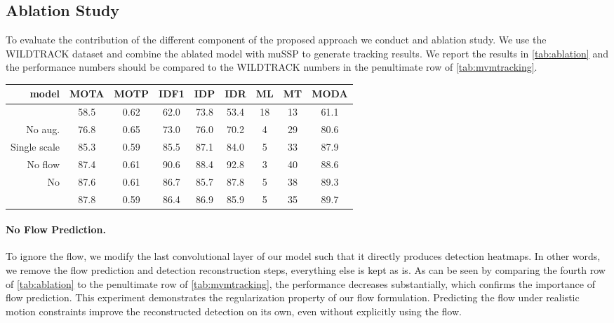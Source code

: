\documentclass[10pt,twocolumn,letterpaper]{article}
\begin{document}
\subsection{Ablation Study}
To evaluate the contribution of the different component of the proposed approach we conduct and ablation study. We use the WILDTRACK dataset and combine the ablated model with muSSP to generate tracking results.  We report the results in \cref{tab:ablation} and the performance numbers should be compared to the WILDTRACK numbers in the penultimate row of \cref{tab:mvmtracking}.
\begin{table*}[h]
    \begin{center}
    \begin{tabular}{r  c c c c c c c c } \toprule
    
model & MOTA & MOTP & IDF1 & IDP & IDR & ML & MT &  MODA \\ \midrule
     & 58.5 & 0.62 & 62.0 & 73.8 & 53.4 & 18 & 13 & 61.1 \\
    No aug. & 76.8 & 0.65 & 73.0 & 76.0 & 70.2 & 4  & 29 & 80.6 \\
    Single scale & 85.3 & 0.59 & 85.5 & 87.1 & 84.0 & 5  & 33 & 87.9 \\
    No flow & 87.4 & 0.61 & 90.6 & 88.4 & 92.8 & 3 & 40 & 88.6  \\
    No  & 87.6 & 0.61 & 86.7 & 85.7 & 87.8 & 5 & 38 & 89.3  \\
     & 87.8 & 0.59 & 86.4 & 86.9 & 85.9 & 5 & 35 & 89.7  \\
    \bottomrule
    \end{tabular}
    \end{center}
      \caption{\textbf{Ablation result on multi-view multi-person tracking} Using the WILDTRACK dataset, 
      we test how each component of our model contributes to the overall performance. We remove: the flow balancing term in the loss (), the data augmentation, the multi-scale view aggregation and replace it with a single scale one. We replace the flow by directly regressing detection, we remove the temporal consistency term of our loss. All the results are computed using the muSSP association algorithm (comparable to the penultimate row of \cref{tab:mvmtracking})
      }  
     \label{tab:ablation}
     \vspace{-0.5em}
    \end{table*} 
\paragraph*{No Flow Prediction.}
To ignore the flow, we modify the last convolutional layer of our model such that it directly produces detection heatmaps.  In other words, we remove the flow prediction and detection reconstruction steps, everything else is kept as is. As can be seen by comparing the fourth row of \cref{tab:ablation} to the penultimate row of \cref{tab:mvmtracking}, the performance decreases substantially, which confirms the importance of flow prediction. This experiment demonstrates the regularization property of our flow formulation. Predicting the flow under realistic motion constraints improve the reconstructed detection on its own, even without explicitly using the flow.
\end{document}
